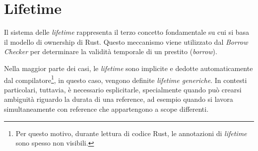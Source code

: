 \section{Lifetime}
Il sistema delle \textit{lifetime} rappresenta il terzo concetto fondamentale su cui si basa il modello di ownership di Rust. Questo meccanismo viene utilizzato dal \textit{Borrow Checker} per determinare la validità temporale di un prestito (\textit{borrow}).

Nella maggior parte dei casi, le \textit{lifetime} sono implicite e dedotte automaticamente dal compilatore\footnote{Per questo motivo, durante lettura di codice Rust, le annotazioni di \textit{lifetime} sono spesso non visibili.}, in questo caso, vengono definite \textit{lifetime generiche}. In contesti particolari, tuttavia, è necessario esplicitarle, specialmente quando può crearsi ambiguità riguardo la durata di una reference, ad esempio quando si lavora simultaneamente con reference che appartengono a scope differenti.

